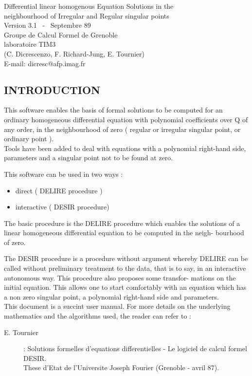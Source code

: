 


\begin{center}
Differential linear homogenous Equation Solutions in the \\
neighbourhood of Irregular and Regular singular points \\[\baselineskip]
Version 3.1~ -~ Septembre 89 \\[2\baselineskip]
Groupe de Calcul Formel de Grenoble \\
laboratoire TIM3 \\[\baselineskip]
(C. Dicrescenzo, F. Richard-Jung, E. Tournier) \\[\baselineskip]
E-mail: dicresc@afp.imag.fr
\end{center}
\vspace*{3\baselineskip}

\subsection{INTRODUCTION}

This software enables the basis of formal solutions to be computed for an
ordinary homogeneous differential equation with polynomial coefficients
over Q of any order, in the neighbourhood of zero ( regular or irregular
singular point, or ordinary point ). \\
Tools have been added to deal with equations with a polynomial right-hand
side, parameters and a singular point not to be found at zero.

This software can be used in two ways : 
\begin{itemize}
\item direct ( DELIRE procedure )
\item interactive ( DESIR procedure)
\end{itemize}

The basic procedure is the DELIRE procedure which enables the solutions of
a linear homogeneous differential equation to be computed in the neigh-
bourhood of zero.

The DESIR procedure is a procedure without argument whereby DELIRE can be
called without preliminary treatment to the data, that is to say, in an
interactive autonomous way. This procedure also proposes some transfor-
mations on the initial equation. This allows one to start comfortably
with an equation which has a non zero singular point, a polynomial
right-hand side and parameters. \\
This document is a succint user manual. For more details on the underlying
mathematics and the algorithms used, the reader can refer to : 
\begin{center}
\begin{description}
\item[E. Tournier] : Solutions formelles d'equations differentielles - Le
logiciel de calcul formel DESIR. \\
These d'Etat de l'Universite Joseph Fourier (Grenoble - avril 87).
\end{description}
\end{center}

